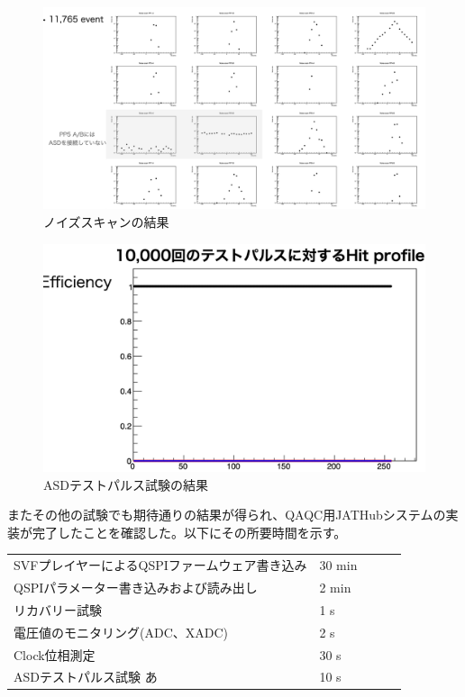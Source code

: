 \begin{figure} 
\centering
\includegraphics[width=16cm]{fig/QAQCnoisescan.png}
\caption[ノイズスキャン]{ノイズスキャンの結果}
\label{QAQCnoisescan}
\end{figure}

\begin{figure} 
\centering
\includegraphics[width=16cm]{fig/QAQCresult.png}
\caption[ASDテストパルスの結果]{ASDテストパルス試験の結果}
\label{QAQCresult}
\end{figure}

またその他の試験でも期待通りの結果が得られ、QAQC用JATHubシステムの実装が完了したことを確認した。以下にその所要時間を示す。

\begin{table}[]
    \begin{tabular}{lllll}
    SVFプレイヤーによるQSPIファームウェア書き込み    & 30 min &  &  &  \\
    QSPIパラメーター書き込みおよび読み出し         & 2 min  &  &  &  \\
    リカバリー試験                       & 1 s    &  &  &  \\
    電圧値のモニタリング(ADC、XADC) & 2 s    &  &  &  \\
    Clock位相測定                     & 30 s   &  &  &  \\
    ASDテストパルス試験  あ                & 10 s   &  &  & 
    \end{tabular}
\end{table}

